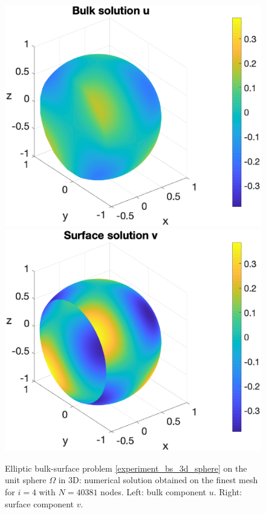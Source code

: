 \documentclass[a4paper]{article}
\begin{document}
\begin{figure}[H]
\begin{center}
\hspace*{-10mm}
\includegraphics[scale=0.4]{bs_3d_sphere_nx41_u.eps}
\hspace*{-5mm}
\includegraphics[scale=0.4]{bs_3d_sphere_nx41_v.eps}
\end{center}
\caption{Elliptic bulk-surface  problem \eqref{experiment_bs_3d_sphere} on the unit sphere $\Omega$ in 3D: numerical solution obtained on the finest mesh for $i=4$ with $N= 40381$ nodes. Left: bulk component $u$. Right: surface component $v$.}
\label{fig:bs_3d_numsol_sphere}
\end{figure} 
 


\end{document}
